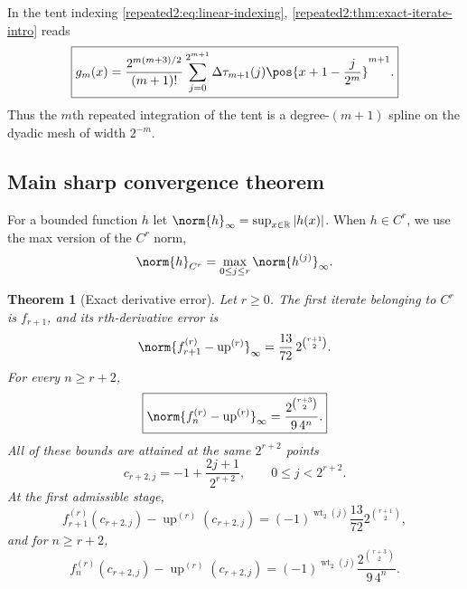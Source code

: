 \documentclass[11pt,oneside]{article}
\newtheorem{theorem}{Theorem}[section]
\theoremstyle{definition}
\theoremstyle{remark}
\newcommand{\R}{\mathbb R}
\newcommand{\Up}{\operatorname{up}}
\newcommand{\wt}{\operatorname{wt}_2}
\begin{document}
In the tent indexing \eqref{repeated2:eq:linear-indexing}, \cref{repeated2:thm:exact-iterate-intro} reads
\begin{equation}
 \boxed{\displaystyle
 g_m(x)=\frac{2^{m(m+3)/2}}{(m+1)!}
 \sum_{j=0}^{2^{m+1}}\Delta\tau_{m+1}(j)
 \pos{x+1-\frac{j}{2^m}}^{m+1}.}
 \label{repeated2:eq:exact-tent-indexing}
\end{equation}
Thus the $m$th repeated integration of the tent is a degree-$(m+1)$ spline on the dyadic
mesh of width $2^{-m}$.

\subsection{Main sharp convergence theorem}

For a bounded function $h$ let $\norm{h}_\infty=\sup_{x\in\R}|h(x)|$.  When $h\in C^r$,
we use the max version of the $C^r$ norm,
\begin{equation}
 \norm{h}_{C^r}=\max_{0\le j\le r}\norm{h^{(j)}}_\infty.
 \label{repeated2:eq:Cr-norm}
\end{equation}

\begin{theorem}[Exact derivative error]
\label{repeated2:thm:main-exact-rate-intro}
Let $r\ge0$.
The first iterate belonging to $C^r$ is $f_{r+1}$, and its $r$th-derivative error is
\begin{equation}
 \norm{f_{r+1}^{(r)}-\Up^{(r)}}_\infty
 =\frac{13}{72}\,2^{\binom{r+1}{2}}.
 \label{repeated2:eq:first-admissible-error}
\end{equation}
For every $n\ge r+2$,
\begin{equation}
 \boxed{\displaystyle
 \norm{f_n^{(r)}-\Up^{(r)}}_\infty
 =\frac{2^{\binom{r+3}{2}}}{9\,4^n}.}
 \label{repeated2:eq:main-exact-rate}
\end{equation}
All of these bounds are attained at the same $2^{r+2}$ points
\begin{equation}
 c_{r+2,j}=-1+\frac{2j+1}{2^{r+2}},
 \qquad 0\le j<2^{r+2}.
 \label{repeated2:eq:error-extremizer-grid}
\end{equation}
At the first admissible stage,
\begin{equation}
 f_{r+1}^{(r)}(c_{r+2,j})-\Up^{(r)}(c_{r+2,j})
 =(-1)^{\wt(j)}\frac{13}{72}2^{\binom{r+1}{2}},
 \label{repeated2:eq:signed-first-stage-error}
\end{equation}
and for $n\ge r+2$,
\begin{equation}
 f_n^{(r)}(c_{r+2,j})-\Up^{(r)}(c_{r+2,j})
 =(-1)^{\wt(j)}\frac{2^{\binom{r+3}{2}}}{9\,4^n}.
 \label{repeated2:eq:signed-extremizer-error}
\end{equation}
\end{theorem}
\end{document}
